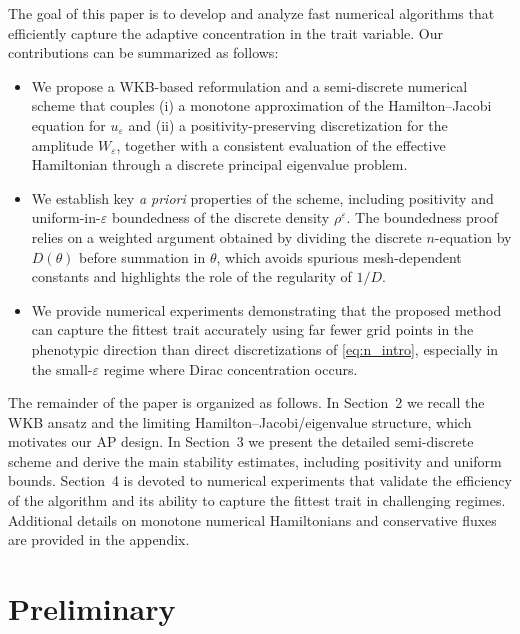 \documentclass[11pt, dina4, amsfont12]{article}
\begin{document}
The goal of this paper is to develop and analyze fast numerical algorithms that
efficiently capture the adaptive concentration in the trait variable.
Our contributions can be summarized as follows:
\begin{itemize}
\item We propose a WKB-based reformulation and a semi-discrete numerical scheme
that couples (i) a monotone approximation of the Hamilton--Jacobi equation for
$u_\varepsilon$ and (ii) a positivity-preserving discretization for the amplitude
$W_\varepsilon$, together with a consistent evaluation of the effective Hamiltonian
through a discrete principal eigenvalue problem.
\item We establish key \emph{a priori} properties of the scheme, including
positivity and uniform-in-$\varepsilon$ boundedness of the discrete density
$\rho^\varepsilon$. The boundedness proof relies on a weighted argument obtained
by dividing the discrete $n$-equation by $D(\theta)$ before summation in $\theta$,
which avoids spurious mesh-dependent constants and highlights the role of the
regularity of $1/D$.
\item We provide numerical experiments demonstrating that the proposed method can
capture the fittest trait accurately using far fewer grid points in the phenotypic
direction than direct discretizations of \eqref{eq:n_intro}, especially in the
small-$\varepsilon$ regime where Dirac concentration occurs.
\end{itemize}

The remainder of the paper is organized as follows. In Section~2 we recall the
WKB ansatz and the limiting Hamilton--Jacobi/eigenvalue structure, which motivates
our AP design. In Section~3 we present the detailed semi-discrete scheme and
derive the main stability estimates, including positivity and uniform bounds.
Section~4 is devoted to numerical experiments that validate the efficiency of
the algorithm and its ability to capture the fittest trait in challenging regimes.
Additional details on monotone numerical Hamiltonians and conservative fluxes are
provided in the appendix.


\section{Preliminary}


\end{document}

